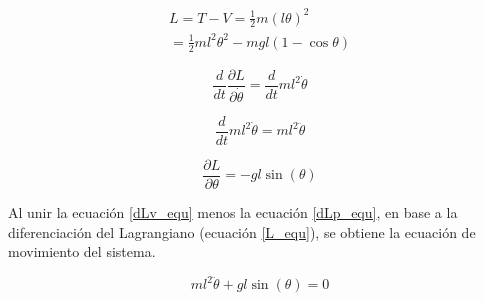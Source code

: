\begin{large}
\begin{align*}
L = T - V = \frac{1}{2}m(l\theta)^2 \\
= \frac{1}{2}ml^2\theta^2 - mgl(1-\cos \theta)
\end{align*}
\end{large}

\begin{large}
\begin{equation*}
\dfrac{d}{dt} \dfrac{\partial L}{\partial \dot{\theta}} = \dfrac{d}{dt} ml^2\dot{\theta}
\end{equation*}
\end{large}
\begin{large}
\begin{equation} \label{dLv_equ}
\dfrac{d}{dt} ml^2\dot{\theta} = ml^2\ddot{\theta}
\end{equation}
\end{large}
\begin{large}
\begin{equation} \label{dLp_equ}
\dfrac{\partial L}{\partial\theta} = -gl\sin(\theta)
\end{equation}
\end{large}
Al unir la ecuación \ref{dLv_equ} menos la ecuación \ref{dLp_equ}, en base a la diferenciación del Lagrangiano (ecuación \ref{L_equ}), se obtiene la ecuación de movimiento del sistema.
\begin{large}
\begin{equation}
ml^2\ddot{\theta} + gl\sin(\theta) = 0
\end{equation}
\end{large}
